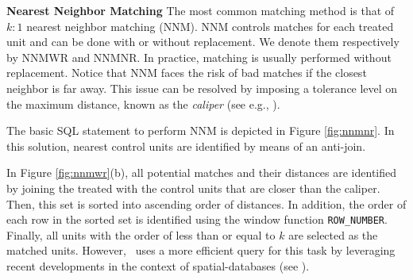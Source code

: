 
  
{\bf Nearest Neighbor Matching}
\label{sec:nnm}
The most common matching method is that of $k:1$ nearest neighbor
matching (NNM). NNM controls matches for each treated
unit and can be done with or without replacement. We denote
them respectively by NNMWR and NNMNR. In practice, matching is usually
performed without replacement.  Notice that NNM faces the risk of bad
matches if the closest neighbor is far away. This issue can be
resolved by imposing a tolerance level on the maximum distance, known
as the {\em caliper} (see e.g., \cite{lunt2014selecting}). 

 The basic SQL statement to perform NNM 
is depicted in Figure \ref{fig:nnmnr}. In this solution, nearest control units are identified by means of an anti-join.   In Figure \ref{fig:nnmwr}(b), all potential matches and their distances are identified by
joining the treated with the control units that are closer than
the caliper. Then, this set is sorted into ascending order of
distances.  In addition, the order of each row in the sorted set is identified
using the window function {\verb|ROW_NUMBER|}. Finally, all units with the order of less than or equal to $k$ are selected as the matched units.
However, \GSQL\  uses a more efficient query for this task by leveraging recent developments in the context of spatial-databases
(see \cite{obe2015postgis}). 



